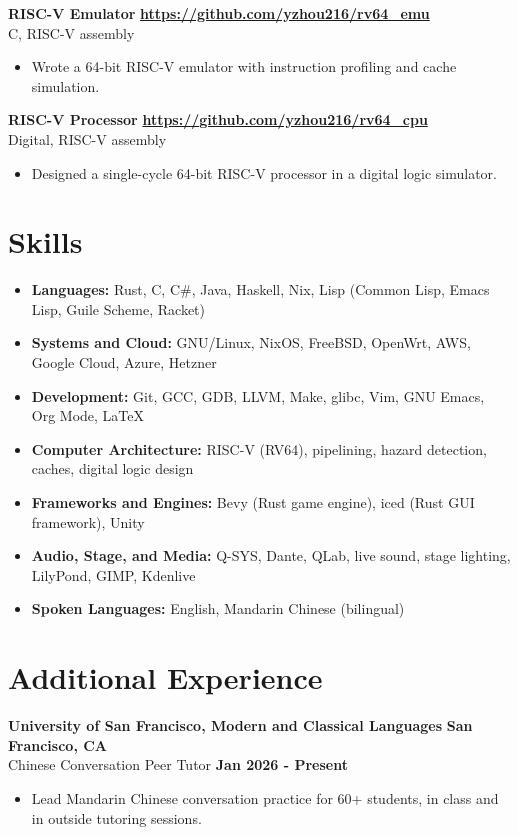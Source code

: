\documentclass[letterpaper]{article}
\newenvironment{entry}[4]{%
  \textbf{#1} \hfill \textbf{#2} \\
  #3 \hfill \textbf{#4}
  \begin{itemize}
}{%
  \end{itemize}
  \medskip
}
\begin{document}
\begin{entry}{RISC-V Emulator}{\url{https://github.com/yzhou216/rv64_emu}}
  {C, RISC-V assembly}{}
  \item Wrote a 64-bit RISC-V emulator with instruction profiling and cache
    simulation.
\end{entry}

\begin{entry}{RISC-V Processor}{\url{https://github.com/yzhou216/rv64_cpu}}
  {Digital, RISC-V assembly}{}
  \item Designed a single-cycle 64-bit RISC-V processor in a digital logic
    simulator.
\end{entry}

\section*{Skills}

\begin{itemize}
  \item \textbf{Languages:} Rust, C, C\#, Java, Haskell, Nix,
    Lisp (Common Lisp, Emacs Lisp, Guile Scheme, Racket)
  \item \textbf{Systems and Cloud:} GNU/Linux, NixOS, FreeBSD, OpenWrt, AWS,
    Google Cloud, Azure, Hetzner
  \item \textbf{Development:} Git, GCC, GDB, LLVM, Make, glibc, Vim,
    GNU Emacs, Org Mode, \LaTeX
  \item \textbf{Computer Architecture:} RISC-V (RV64), pipelining, hazard
    detection, caches, digital logic design
  \item \textbf{Frameworks and Engines:} Bevy (Rust game engine), iced (Rust GUI
    framework), Unity
  \item \textbf{Audio, Stage, and Media:} Q-SYS, Dante, QLab, live sound,
    stage lighting, LilyPond, GIMP, Kdenlive
  \item \textbf{Spoken Languages:} English, Mandarin Chinese (bilingual)
\end{itemize}

\section*{Additional Experience}

\begin{entry}{University of San Francisco, Modern and Classical Languages}
  {San Francisco, CA}
  {Chinese Conversation Peer Tutor}{Jan 2026 - Present}
  \item Lead Mandarin Chinese conversation practice for 60+ students, in
    class and in outside tutoring sessions.
\end{entry}
\end{document}
